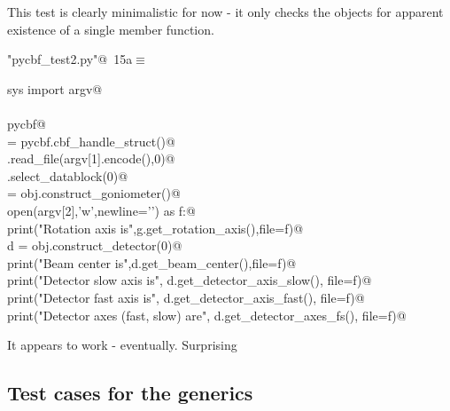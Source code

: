 \documentclass[10pt,a4paper,twoside,notitlepage]{article}
\begin{document}
This test is clearly minimalistic for now - it only checks the objects 
for apparent existence of
a single member function.

\begin{flushleft} \small
\begin{minipage}{\linewidth}\label{scrap14}\raggedright\small
{} \verb@"pycbf_test2.py"@\nobreak\ {\footnotesize {15a}}$\equiv$
\vspace{-1ex}
\begin{list}{}{} \item
\mbox{}\verb@from sys import argv@\\
\mbox{}\verb@@\\
\mbox{}\verb@import pycbf@\\
\mbox{}\verb@obj = pycbf.cbf_handle_struct()@\\
\mbox{}\verb@obj.read_file(argv[1].encode(),0)@\\
\mbox{}\verb@obj.select_datablock(0)@\\
\mbox{}\verb@g = obj.construct_goniometer()@\\
\mbox{}\verb@with open(argv[2],'w',newline='\n') as f:@\\
\mbox{}\verb@    print("Rotation axis is",g.get_rotation_axis(),file=f)@\\
\mbox{}\verb@    d = obj.construct_detector(0)@\\
\mbox{}\verb@    print("Beam center is",d.get_beam_center(),file=f)@\\
\mbox{}\verb@    print("Detector slow axis is", d.get_detector_axis_slow(), file=f)@\\
\mbox{}\verb@    print("Detector fast axis is", d.get_detector_axis_fast(), file=f)@\\
\mbox{}\verb@    print("Detector axes (fast, slow) are", d.get_detector_axes_fs(), file=f)@\\
\mbox{}\verb@@{\NWsep}
\end{list}
\vspace{-1.5ex}
\footnotesize
\begin{list}{}{\setlength{\itemsep}{-\parsep}\setlength{\itemindent}{-\leftmargin}}

\item{}
\end{list}
\end{minipage}\vspace{4ex}
\end{flushleft}
It appears to work - eventually. Surprising

\subsection{Test cases for the generics}
\end{document}
